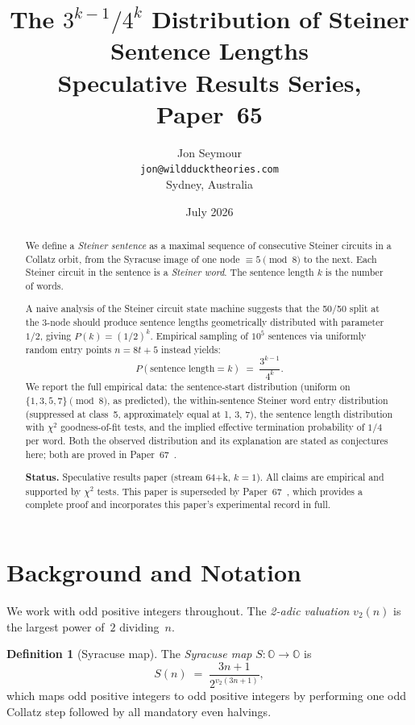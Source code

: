 \documentclass[12pt]{article}
\title{The $3^{k-1}/4^k$ Distribution of Steiner Sentence Lengths\\[0.5em]
       \large Speculative Results Series, Paper~65}
\author{Jon Seymour\\
  \texttt{jon@wildducktheories.com}\\
  Sydney, Australia}
\date{July 2026}
\theoremstyle{definition}
\newtheorem{definition}[theorem]{Definition}
\theoremstyle{remark}
\newcommand{\vt}{v_2}
\newcommand{\Sm}{S}
\begin{document}
\maketitle

\begin{abstract}
We define a \emph{Steiner sentence} as a maximal sequence of consecutive Steiner
circuits in a Collatz orbit, from the Syracuse image of one node $\equiv 5\pmod{8}$
to the next. Each Steiner circuit in the sentence is a \emph{Steiner word}.
The sentence length $k$ is the number of words.

A naive analysis of the Steiner circuit state machine suggests that the 50/50
split at the 3-node should produce sentence lengths geometrically distributed with
parameter $1/2$, giving $P(k) = (1/2)^k$. Empirical sampling of $10^5$ sentences
via uniformly random entry points $n = 8t+5$ instead yields:
\[
  P(\text{sentence length} = k) \;=\; \frac{3^{k-1}}{4^k}.
\]
We report the full empirical data: the sentence-start distribution (uniform on
$\{1,3,5,7\}\pmod{8}$, as predicted), the within-sentence Steiner word entry
distribution (suppressed at class~5, approximately equal at 1, 3, 7), the
sentence length distribution with $\chi^2$ goodness-of-fit tests, and the implied
effective termination probability of $1/4$ per word.
Both the observed distribution and its explanation are stated as conjectures here;
both are proved in Paper~67~\cite{paper67}.

\medskip
\noindent\textbf{Status.} Speculative results paper (stream 64+k, $k=1$).
All claims are empirical and supported by $\chi^2$ tests.
This paper is superseded by Paper~67~\cite{paper67}, which provides a complete
proof and incorporates this paper's experimental record in full.
\end{abstract}

\tableofcontents

\section{Background and Notation}
\label{sec:background}

We work with odd positive integers throughout.
The \emph{2-adic valuation} $\vt(n)$ is the largest power of~$2$ dividing~$n$.

\begin{definition}[Syracuse map]
The \emph{Syracuse map} $\Sm : \mathbb{O} \to \mathbb{O}$ is
\[
  \Sm(n) \;=\; \frac{3n+1}{2^{\vt(3n+1)}},
\]
which maps odd positive integers to odd positive integers by performing one odd
Collatz step followed by all mandatory even halvings.
\end{definition}
\end{document}
